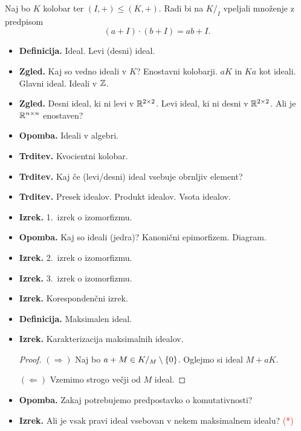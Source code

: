 \begin{enumerate}
    Naj bo \(K\) kolobar ter \((I, +) \leq (K, +)\). Radi bi na \(K/_I\) vpeljali množenje z predpisom
    \[(a + I) \cdot (b + I) = ab + I.\]
    \begin{itemize}
        \item \textbf{Definicija.} Ideal. Levi (desni) ideal.
        \item \textbf{Zgled.} Kaj so vedno ideali v \(K\)? Enostavni kolobarji. \(aK\) in \(Ka\) kot ideali. Glavni ideal. Ideali v \(\mathbb{Z}\).
        \item \textbf{Zgled.} Desni ideal, ki ni levi v \(\mathbb{R}^{2 \times 2}\). Levi ideal, ki ni desni v \(\mathbb{R}^{2 \times 2}\). Ali je \(\mathbb{R}^{n \times n}\) enostaven?
        \item \textbf{Opomba.} Ideali v algebri.
        \item \textbf{Trditev.} Kvocientni kolobar.
        \item \textbf{Trditev.} Kaj če (levi/desni) ideal vsebuje obrnljiv element?
        \item \textbf{Trditev.} Presek idealov. Produkt idealov. Vsota idealov.
        \item \textbf{Izrek.} 1.\ izrek o izomorfizmu. \todo{*}
        \item \textbf{Opomba.} Kaj so ideali (jedra)? Kanonični epimorfizem. Diagram.
        \item \textbf{Izrek.} 2.\ izrek o izomorfizmu.
        \item \textbf{Izrek.} 3.\ izrek o izomorfizmu.
        \item \textbf{Izrek.} Korespondenčni izrek.
        \item \textbf{Definicija.} Maksimalen ideal.
        \item \textbf{Izrek.} Karakterizacija maksimalnih idealov.
        \begin{proof}
            \((\Rightarrow)\) Naj bo \(a + M \in K/_M \setminus \{0\}\). Oglejmo si ideal \(M + aK\).

            \((\Leftarrow)\) Vzemimo strogo večji od \(M\) ideal.
        \end{proof}
        \item \textbf{Opomba.} Zakaj potrebujemo predpostavko o komutativnosti?
        \item \textbf{Izrek.} Ali je vsak pravi ideal vsebovan v nekem maksimalnem idealu? \textcolor{red}{(*)}
    \end{itemize}


\end{enumerate}

